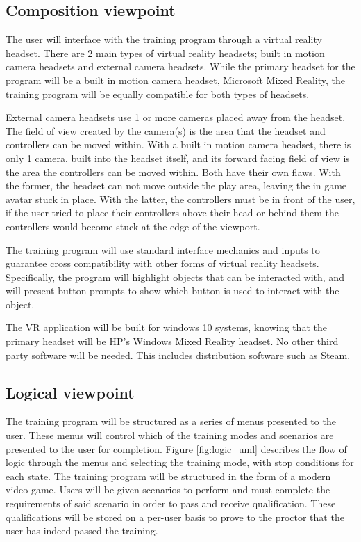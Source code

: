 \documentclass[onecolumn, draftclsnofoot,10pt, compsoc]{IEEEtran}
\begin{document}
\subsection{Composition viewpoint}
The user will interface with the training program through a virtual reality headset. There are 2 main types of virtual reality headsets; built in motion camera headsets and external camera headsets. While the primary headset for the program will be a built in motion camera headset, Microsoft Mixed Reality, the training program will be equally compatible for both types of headsets.

External camera headsets use 1 or more cameras placed away from the headset. The field of view created by the camera(s) is the area that the headset and controllers can be moved within. With a built in motion camera headset, there is only 1 camera, built into the headset itself, and its forward facing field of view is the area the controllers can be moved within. Both have their own flaws. With the former, the headset can not move outside the play area, leaving the in game avatar stuck in place. With the latter, the controllers must be in front of the user, if the user tried to place their controllers above their head or behind them the controllers would become stuck at the edge of the viewport. 

The training program will use standard interface mechanics and inputs to guarantee cross compatibility with other forms of virtual reality headsets. Specifically, the program will highlight objects that can be interacted with, and will present button prompts to show which button is used to interact with the object.  

The VR application will be built for windows 10 systems, knowing that the primary headset will be HP's Windows Mixed Reality headset. No other third party software will be needed. This includes distribution software such as Steam.
\subsection{Logical viewpoint}

The training program will be structured as a series of menus presented to the user. These menus will control which of the training modes and scenarios are presented to the user for completion. Figure \ref{fig:logic_uml} describes the flow of logic through the menus and selecting the training mode, with stop conditions for each state. The training program will be structured in the form of a modern video game. Users will be given scenarios to perform and must complete the requirements of said scenario in order to pass and receive qualification. These qualifications will be stored on a per-user basis to prove to the proctor that the user has indeed passed the training.
\end{document}
